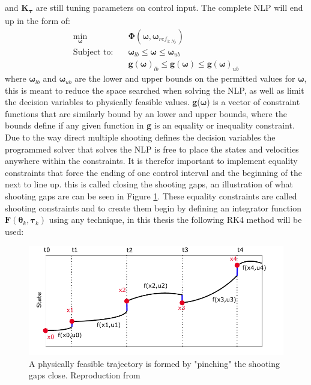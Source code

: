 and \textbf{K}\textsubscript{$\bm{\tau}$} are still tuning parameters on control input. The complete NLP will end up in the form of:
\begin{subequations}
    \label{EQ:NLP}
    \begin{align}
        \min_{\bm{\omega}} \quad & \bm{\Phi}(\bm{\omega}, \bm{\omega}_{ref_{1:N_p}}) \\ %
        \textrm{Subject to:} \quad & \bm{\omega}_{lb} \leq \bm{\omega} \leq \bm{\omega}_{ub} \\
                            \quad & \textbf{g}(\bm{\omega})_{lb} \leq \textbf{g}(\bm{\omega}) \leq \textbf{g}(\bm{\omega})_{ub}
    \end{align}
\end{subequations}
where $\bm{\omega}_{lb}$ and $\bm{\omega}_{ub}$ are the lower and upper bounds on the permitted values for $\bm{\omega}$, this is meant to reduce the space searched when
solving the NLP, as well as limit the decision variables to physically feasible values. \textbf{g}($\bm{\omega}$) is a vector of constraint functions that are similarly bound
by an lower and upper bounds, where the bounds define if any given function in \textbf{g} is an equality or inequality constraint. Due to the way direct multiple shooting
defines the decision variables the programmed solver that solves the \gls{NLP} is free to place the states and velocities anywhere within the constraints. It is therefor
important to implement equality constraints that force the ending of one control interval and the beginning of the next to line up. this is called closing the shooting gaps, 
an illustration of what shooting gaps are can be seen in Figure \ref{FIG: Shooting Gaps}. These equality constraints are called shooting constraints and to create them begin
by defining an integrator function $\textbf{F}(\bm{\theta}_{k}, \bm{\tau}_k)$ using any technique, in this thesis the following \gls{RK4} method will be used:

\begin{figure}
    \includegraphics[width=\textwidth]{Images/MultipleShooting.pdf}
    \caption{A physically feasible trajectory is formed by "pinching" the shooting gaps close. Reproduction from \cite{gros2017Lecture}}
    \label{FIG: Shooting Gaps}
\end{figure}

